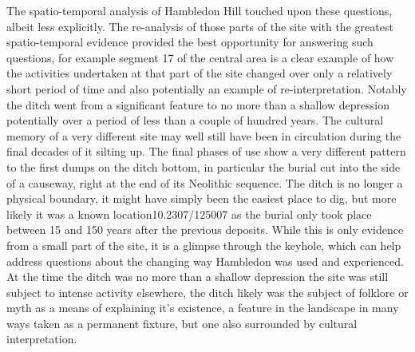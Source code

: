 The spatio-temporal analysis of Hambledon Hill touched upon these questions, albeit less explicitly.  The re-analysis of those parts of the site with the greatest spatio-temporal evidence provided the best opportunity for answering such questions, for example segment 17 of the central area is a clear example of how the activities undertaken at that part of the site changed over only a relatively short period of time and also potentially an example of re-interpretation. Notably the ditch went from a significant feature to no more than a shallow depression potentially over a period of less than a couple of hundred years. The cultural memory of a very different site may well still have been in circulation during the final decades of it silting up. The final phases of use show a very different pattern to the first dumps on the ditch bottom, in particular the burial cut into the side of a causeway, right at the end of its Neolithic sequence. The ditch is no longer a physical boundary, it might have simply been the easiest place to dig, but more likely it was a known location10.2307/125007 as the burial only took place between 15 and 150 years after the previous deposits. While this is only evidence from a small part of the site, it is a glimpse through the keyhole, which can help address questions about the changing way Hambledon was used and experienced. At the time the ditch was no more than a shallow depression the site was still subject to intense activity elsewhere, the ditch likely was the subject of folklore or myth as a means of explaining it's existence, a feature in the landscape in many ways taken as a permanent fixture, but one also surrounded by cultural interpretation.

